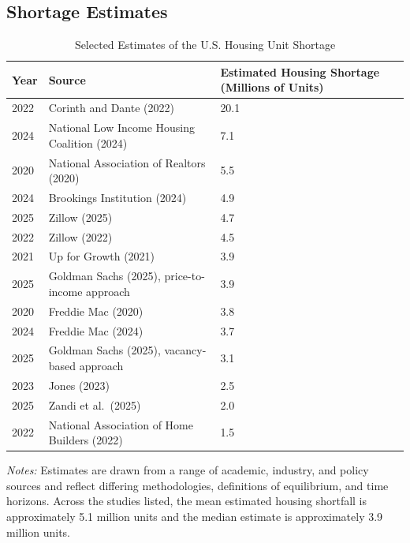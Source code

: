 \documentclass[pdflatex,sn-basic]{sn-jnl}%
\theoremstyle{thmstyleone}%
\theoremstyle{thmstyletwo}%
\theoremstyle{thmstylethree}%
\begin{document}
\begin{appendices}
\section{Shortage Estimates}\label{appendix_a}

\begin{table}[htbp]
	\centering
	\caption{Selected Estimates of the U.S. Housing Unit Shortage}
	\label{tab:housing_shortage_estimates}
	\begin{tabular}{lll}
		\hline
		Year & Source & Estimated Housing Shortage (Millions of Units) \\
		\hline
		2022 & Corinth and Dante (2022) & 20.1 \\
		2024 & National Low Income Housing Coalition (2024) & 7.1 \\
		2020 & National Association of Realtors (2020) & 5.5 \\
		2024 & Brookings Institution (2024) & 4.9 \\
		2025 & Zillow (2025) & 4.7 \\
		2022 & Zillow (2022) & 4.5 \\
		2021 & Up for Growth (2021) & 3.9 \\
		2025 & Goldman Sachs (2025), price-to-income approach & 3.9 \\
		2020 & Freddie Mac (2020) & 3.8 \\
		2024 & Freddie Mac (2024) & 3.7 \\
		2025 & Goldman Sachs (2025), vacancy-based approach & 3.1 \\
		2023 & Jones (2023) & 2.5 \\
		2025 & Zandi et al.\ (2025) & 2.0 \\
		2022 & National Association of Home Builders (2022) & 1.5 \\
		\hline
	\end{tabular}
	\begin{flushleft}
		\footnotesize
		\textit{Notes:} Estimates are drawn from a range of academic, industry, and policy sources and reflect differing methodologies, definitions of equilibrium, and time horizons. Across the studies listed, the mean estimated housing shortfall is approximately 5.1 million units and the median estimate is approximately 3.9 million units.
	\end{flushleft}
\end{table}

% 
% 
% 
% 
% 
% 
\clearpage
\end{appendices}
\end{document}
